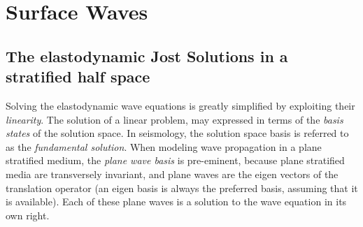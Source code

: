 \chapter{Surface Waves}\label{exten}


\section{The elastodynamic Jost Solutions in a stratified 
half space}\label{subsecJost}

Solving the elastodynamic wave equations is greatly simplified by 
exploiting their {\em linearity\/}. The solution of a linear problem, may 
expressed in terms of the {\em basis states\/} of the solution space. In 
seismology, the solution space basis is referred to as the {\em 
fundamental solution\/}. When  modeling wave propagation in a plane stratified medium, the 
{\em plane wave basis\/} is pre-eminent, because plane 
stratified media are transversely invariant, and plane waves are the 
eigen vectors of the translation operator (an eigen basis is always the 
preferred basis, assuming that it is available). Each of these plane waves 
is a solution to the wave equation in its own right.

